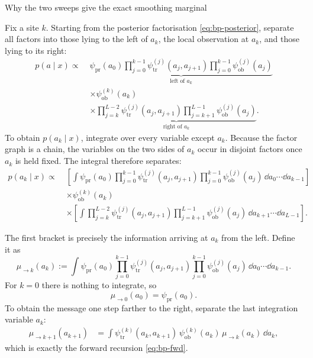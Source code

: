 \begin{toolbox}{Why the two sweeps give the exact smoothing marginal}

Fix a site $k$. Starting from the posterior factorisation
\eqref{eq:bp-posterior}, separate all factors into those lying to the left of
$a_k$, the local observation at $a_k$, and those lying to its right:
\begin{align}
  p(a\mid x)
  \propto\;&
  \underbrace{
  \psi_{\mathrm{pr}}(a_0)
  \prod_{j=0}^{k-1}
    \psi_{\mathrm{tr}}^{(j)}(a_j,a_{j+1})
  \prod_{j=0}^{k-1}
    \psi_{\mathrm{ob}}^{(j)}(a_j)
  }_{\text{left of }a_k}
  \nonumber\\
  &\times
  \psi_{\mathrm{ob}}^{(k)}(a_k)
  \nonumber\\
  &\times
  \underbrace{
  \prod_{j=k}^{L-2}
    \psi_{\mathrm{tr}}^{(j)}(a_j,a_{j+1})
  \prod_{j=k+1}^{L-1}
    \psi_{\mathrm{ob}}^{(j)}(a_j)
  }_{\text{right of }a_k}.
  \label{eq:bp-split-at-k}
\end{align}
To obtain $p(a_k\mid x)$, integrate over every variable except $a_k$.
Because the factor graph is a chain, the variables on the two sides of
$a_k$ occur in disjoint factors once $a_k$ is held fixed. The integral
therefore separates:
\begin{align}
  p(a_k\mid x)
  \propto\;&
  \left[
    \int
    \psi_{\mathrm{pr}}(a_0)
    \prod_{j=0}^{k-1}
      \psi_{\mathrm{tr}}^{(j)}(a_j,a_{j+1})
    \prod_{j=0}^{k-1}
      \psi_{\mathrm{ob}}^{(j)}(a_j)
    \,\dd a_0\cdots\dd a_{k-1}
  \right]
  \nonumber\\
  &\times
  \psi_{\mathrm{ob}}^{(k)}(a_k)
  \nonumber\\
  &\times
  \left[
    \int
    \prod_{j=k}^{L-2}
      \psi_{\mathrm{tr}}^{(j)}(a_j,a_{j+1})
    \prod_{j=k+1}^{L-1}
      \psi_{\mathrm{ob}}^{(j)}(a_j)
    \,\dd a_{k+1}\cdots\dd a_{L-1}
  \right].
  \label{eq:bp-split-integrals}
\end{align}

The first bracket is precisely the information arriving at $a_k$ from the
left. Define it as
\begin{equation}
  \mu_{\to k}(a_k)
  :=
  \int
  \psi_{\mathrm{pr}}(a_0)
  \prod_{j=0}^{k-1}
    \psi_{\mathrm{tr}}^{(j)}(a_j,a_{j+1})
  \prod_{j=0}^{k-1}
    \psi_{\mathrm{ob}}^{(j)}(a_j)
  \,\dd a_0\cdots\dd a_{k-1}.
  \label{eq:bp-fwd-partial}
\end{equation}
For $k=0$ there is nothing to integrate, so
\begin{equation}
  \mu_{\to0}(a_0)=\psi_{\mathrm{pr}}(a_0).
\end{equation}
To obtain the message one step farther to the right, separate the last
integration variable $a_k$:
\begin{align}
  \mu_{\to k+1}(a_{k+1})
  &=
  \int
  \psi_{\mathrm{tr}}^{(k)}(a_k,a_{k+1})\,
  \psi_{\mathrm{ob}}^{(k)}(a_k)\,
  \mu_{\to k}(a_k)\,
  \dd a_k,
\end{align}
which is exactly the forward recursion \eqref{eq:bp-fwd}.


\end{toolbox}

